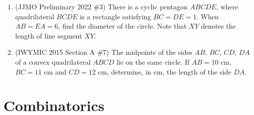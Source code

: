 \documentclass[11pt,letterpaper]{article}
\begin{document}
\begin{enumerate}[resume]
    \item (JJMO Preliminary 2022 \#3) There is a cyclic pentagon $ABCDE$, where quadrilateral $BCDE$ is a rectangle satisfying $BC=DE=1$. When $AB=EA=6$, find the diameter of the circle. Note that $XY$ denotes the length of line segment $XY$.

    \item (IWYMIC 2015 Section A \#7) The midpoints of the sides $AB$, $BC$, $CD$, $DA$ of a convex quadrilateral $ABCD$ lie on the same circle. If $AB=10$ cm, $BC=11$ cm and $CD=12$ cm, determine, in cm, the length of the side $DA$.
\end{enumerate}

\section*{Combinatorics}
\end{document}
